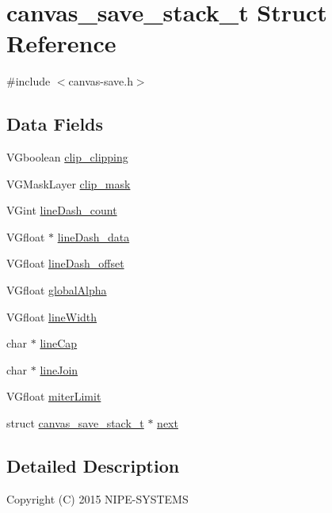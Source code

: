 \hypertarget{structcanvas__save__stack__t}{}\section{canvas\+\_\+save\+\_\+stack\+\_\+t Struct Reference}
\label{structcanvas__save__stack__t}


{\ttfamily \#include $<$canvas-\/save.\+h$>$}

\subsection*{Data Fields}
\begin{DoxyCompactItemize}
\item 
V\+Gboolean \hyperlink{structcanvas__save__stack__t_a2c6afadff95edda2b6919484ece09bfd}{clip\+\_\+clipping}
\item 
V\+G\+Mask\+Layer \hyperlink{structcanvas__save__stack__t_abf0557dc1ac91549a277047c460f577c}{clip\+\_\+mask}
\item 
V\+Gint \hyperlink{structcanvas__save__stack__t_a2df714aaf02b6115f7bc0b5d72a8ddba}{line\+Dash\+\_\+count}
\item 
V\+Gfloat $\ast$ \hyperlink{structcanvas__save__stack__t_a3d7f3449563491d8f796bfd10d9f2720}{line\+Dash\+\_\+data}
\item 
V\+Gfloat \hyperlink{structcanvas__save__stack__t_a2a77bb2fd9162791d2913b8ebaaaf75b}{line\+Dash\+\_\+offset}
\item 
V\+Gfloat \hyperlink{structcanvas__save__stack__t_afe0bfcfcd94ff8e3961bc6fed3789352}{global\+Alpha}
\item 
V\+Gfloat \hyperlink{structcanvas__save__stack__t_ae76623d478ccfaec28e3166c755ec174}{line\+Width}
\item 
char $\ast$ \hyperlink{structcanvas__save__stack__t_ab5800915c7fa9d2afe630239442e1621}{line\+Cap}
\item 
char $\ast$ \hyperlink{structcanvas__save__stack__t_a47a68a239d0bfdf125dea13a89030409}{line\+Join}
\item 
V\+Gfloat \hyperlink{structcanvas__save__stack__t_ad1ac8b9082b1b9f77e91ffd73278cd5a}{miter\+Limit}
\item 
struct \hyperlink{structcanvas__save__stack__t}{canvas\+\_\+save\+\_\+stack\+\_\+t} $\ast$ \hyperlink{structcanvas__save__stack__t_a214b86daeaa6f4461d169921a9c0298d}{next}
\end{DoxyCompactItemize}


\subsection{Detailed Description}
Copyright (C) 2015 N\+I\+P\+E-\/\+S\+Y\+S\+T\+E\+M\+S

